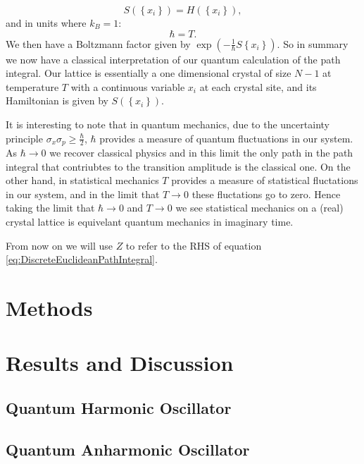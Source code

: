 \documentclass[12pt]{article}
\begin{document}
\begin{equation}
	\label{ActionToHamiltonian}
	S\left(\left\{x_{i}\right\}\right) = H\left(\left\{x_{i}\right\}\right),
\end{equation}
and in units where $k_{B} = 1$:
\begin{equation}
	\label{PlankToBoltzman}
	\hbar = T.
\end{equation}
We then have a Boltzmann factor given by $\exp{\left(-\frac{1}{\hbar}S\left\{x_{i}\right\}\right)}$. So in summary we now have a classical interpretation of our quantum calculation of the path integral. Our lattice is essentially a one dimensional crystal of size $N-1$ at temperature $T$ with a continuous variable $x_i$ at each crystal site, and its Hamiltonian is given by $S\left(\left\{x_i\right\}\right)$.

It is interesting to note that in quantum mechanics, due to the uncertainty principle $\sigma_x\sigma_p \geq \frac{\hbar}{2}$, $\hbar$ provides a measure of quantum fluctuations in our system. As $\hbar \rightarrow 0$ we recover classical physics and in this limit the only path in the path integral that contriubtes to the transition amplitude is the classical one. On the other hand, in statistical mechanics $T$ provides a measure of statistical fluctations in our system, and in the limit that $T \rightarrow 0$ these fluctations go to zero. Hence taking the limit that $\hbar \rightarrow 0$ and $T \rightarrow 0$ we see statistical mechanics on a (real) crystal lattice is equivelant quantum mechanics in imaginary time.

From now on we will use $Z$ to refer to the RHS of equation \ref{eq:DiscreteEuclideanPathIntegral}.

\section{Methods}

\section{Results and Discussion}
\subsection{Quantum Harmonic Oscillator}

\subsection{Quantum Anharmonic Oscillator}
\end{document}
